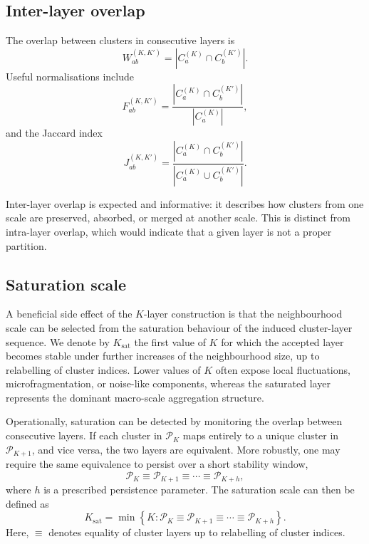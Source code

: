 \documentclass[pdflatex,sn-mathphys-num]{sn-jnl}
\newcommand{\calP}{\mathcal{P}}
\begin{document}
\subsection{Inter-layer overlap}

The overlap between clusters in consecutive layers is
\begin{equation}
W_{ab}^{(K,K')}=|C_a^{(K)}\cap C_b^{(K')}|.
\label{eq:overlap_count}
\end{equation}
Useful normalisations include
\begin{equation}
F_{ab}^{(K,K')}=\frac{|C_a^{(K)}\cap C_b^{(K')}|}{|C_a^{(K)}|},
\label{eq:frac_from}
\end{equation}
and the Jaccard index
\begin{equation}
J_{ab}^{(K,K')}=\frac{|C_a^{(K)}\cap C_b^{(K')}|}{|C_a^{(K)}\cup C_b^{(K')}|}.
\label{eq:jaccard}
\end{equation}

Inter-layer overlap is expected and informative: it describes how clusters from one scale are preserved, absorbed, or merged at another scale. This is distinct from intra-layer overlap, which would indicate that a given layer is not a proper partition.

\subsection{Saturation scale}

A beneficial side effect of the $K$-layer construction is that the neighbourhood scale can be selected from the saturation behaviour of the induced cluster-layer sequence. We denote by $K_{\mathrm{sat}}$ the first value of $K$ for which the accepted layer becomes stable under further increases of the neighbourhood size, up to relabelling of cluster indices. Lower values of $K$ often expose local fluctuations, microfragmentation, or noise-like components, whereas the saturated layer represents the dominant macro-scale aggregation structure.

Operationally, saturation can be detected by monitoring the overlap between consecutive layers. If each cluster in $\calP_K$ maps entirely to a unique cluster in $\calP_{K+1}$, and vice versa, the two layers are equivalent. More robustly, one may require the same equivalence to persist over a short stability window,
\begin{equation}
\calP_K \equiv \calP_{K+1}\equiv\cdots\equiv\calP_{K+h},
\label{eq:partition_stability_window}
\end{equation}
where $h$ is a prescribed persistence parameter. The saturation scale can then be defined as
\begin{equation}
K_{\mathrm{sat}}=
\min\left\{
K:\calP_K \equiv \calP_{K+1}\equiv\cdots\equiv\calP_{K+h}
\right\}.
\label{eq:ksat}
\end{equation}
Here, $\equiv$ denotes equality of cluster layers up to relabelling of cluster indices.
\end{document}
